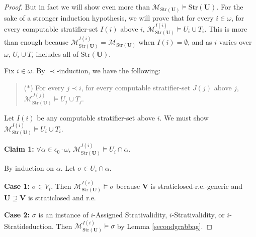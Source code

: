 \documentclass[reqno]{article}
\theoremstyle{definition}
\def\L{\mathscr{L}}
\def\M{\mathscr{M}}
\def\S{\mathbf{S}}
\def\U{\mathbf{U}}
\def\V{\mathbf{V}}
\def\LPA{\L_{\mathrm{PA}}}
\def\epom{\epsilon_0\cdot\omega}
\def\indset{\mathcal I}
\def\myequiv{\Rightarrow}
\newcommand{\case}[1]{\textbf{Case #1:}}
\newcommand{\claim}[1]{\textbf{Claim #1:}}
\newcommand{\str}[1]{\mathrm{Str}(#1)} \newcommand{\Str}[1]{\str{#1}}
\begin{document}
\begin{proof}
But in fact we will show even more than $\M_{\str{\U}}\models\str{\U}$.
For the sake of a stronger induction hypothesis, we will prove that for
every $i\in\omega$, for every computable stratifier-set $I(i)$ above $i$,
$\M^{I(i)}_{\str{\U}}\models U_i\cup T_i$.
This is more than enough because $\M^{I(i)}_{\str{\U}}=\M_{\str{\U}}$ when
$I(i)=\emptyset$, and as $i$ varies over $\omega$, $U_i\cup T_i$ includes
all of $\str{\U}$.

Fix $i\in\omega$. By $\prec$-induction, we have the following:
\begin{quote}
($*$) For every $j\prec i$, for every computable stratifier-set $J(j)$ above
$j$, $\M^{J(j)}_{\str{\U}}\models U_j\cup T_j$.
\end{quote}

Let $I(i)$ be any computable stratifier-set above $i$.
We must show $\M^{I(i)}_{\str{\U}}\models U_i\cup T_i$.


\item
\claim1
$\forall \alpha\in\epom$, $\M^{I(i)}_{\str{\U}}\models U_i\cap\alpha$.

\item
By induction on $\alpha$.
Let $\sigma\in U_i\cap\alpha$.

\item
\case1
$\sigma\in V_i$.
Then $\M^{I(i)}_{\str{\U}}\models\sigma$ because
$\V$ is straticlosed-r.e.-generic and $\U\supseteq\V$
is straticlosed and r.e.

\item
\case2
$\sigma$ is an instance of $i$-Assigned Strativalidity, $i$-Strativalidity,
or $i$-Stratideduction.  Then $\M^{I(i)}_{\str{\U}}\models\sigma$
by Lemma \ref{secondgrabbag}.


\end{proof}
\end{document}
